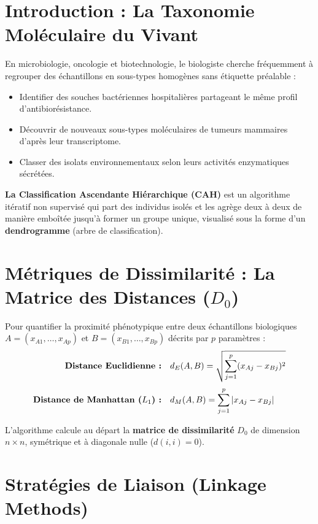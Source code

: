 \documentclass[11pt,a4paper]{article}
\begin{document}

\section{Introduction : La Taxonomie Moléculaire du Vivant}

En microbiologie, oncologie et biotechnologie, le biologiste cherche fréquemment à regrouper des échantillons en sous-types homogènes sans étiquette préalable :
\begin{itemize}[leftmargin=*, label=\faAngleRight]
  \item Identifier des souches bactériennes hospitalières partageant le même profil d'antibiorésistance.
  \item Découvrir de nouveaux sous-types moléculaires de tumeurs mammaires d'après leur transcriptome.
  \item Classer des isolats environnementaux selon leurs activités enzymatiques sécrétées.
\end{itemize}

\textbf{La Classification Ascendante Hiérarchique (CAH)} est un algorithme itératif non supervisé qui part des individus isolés et les agrège deux à deux de manière emboîtée jusqu'à former un groupe unique, visualisé sous la forme d'un \textbf{dendrogramme} (arbre de classification).

\section{Métriques de Dissimilarité : La Matrice des Distances ($D_0$)}

Pour quantifier la proximité phénotypique entre deux échantillons biologiques $A = (x_{A1}, \dots, x_{Ap})$ et $B = (x_{B1}, \dots, x_{Bp})$ décrits par $p$ paramètres :
\begin{align*}
  \text{\textbf{Distance Euclidienne :}} \quad & d_E(A, B) = \sqrt{\sum_{j=1}^p (x_{Aj} - x_{Bj})^2} \\[1mm]
  \text{\textbf{Distance de Manhattan ($L_1$) :}} \quad & d_M(A, B) = \sum_{j=1}^p |x_{Aj} - x_{Bj}|
\end{align*}

L'algorithme calcule au départ la \textbf{matrice de dissimilarité} $D_0$ de dimension $n \times n$, symétrique et à diagonale nulle ($d(i,i) = 0$).

\section{Stratégies de Liaison (Linkage Methods)}
\end{document}
